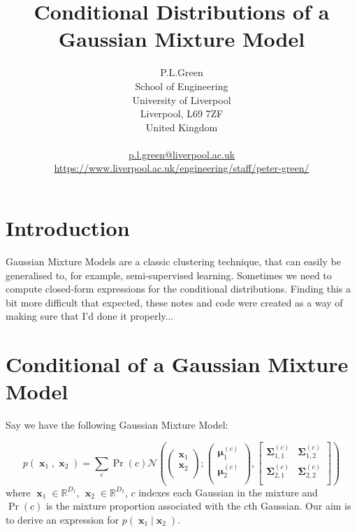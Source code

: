 \documentclass[a4paper, 11pt]{article}
\DeclareMathOperator{\x}{\boldsymbol{x}}
\DeclareMathOperator{\bmu}{\boldsymbol{\mu}}
\DeclareMathOperator{\bSigma}{\boldsymbol{\Sigma}}
\begin{document}
\title{Conditional Distributions of a Gaussian Mixture Model}
\author{P.L.Green\\
School of Engineering\\
University of Liverpool\\
Liverpool, L69 7ZF\\
United Kingdom\\
\\
\href{mailto:p.l.green@liverpool.ac.uk}{p.l.green@liverpool.ac.uk} \\
\url{https://www.liverpool.ac.uk/engineering/staff/peter-green/}
}
\maketitle

\section{Introduction}
Gaussian Mixture Models are a classic clustering technique, that can easily be generalised to, for example, semi-supervised learning. Sometimes we need to compute closed-form expressions for the conditional distributions. Finding this a bit more difficult that expected, these notes and code were created as a way of making sure that I'd done it properly...  

\section{Conditional of a Gaussian Mixture Model}
Say we have the following Gaussian Mixture Model:

\begin{equation}
	p(\x_1, \x_2) = 
    \sum_c \Pr(c)
    \mathcal{N}\left(
		\left(
		\begin{array}{c}
			\x_1 \\
			\x_2 \\
		\end{array}
		\right);
		\left(
		\begin{array}{c}
			\bmu_1^{(c)} \\
			\bmu_2^{(c)} \\
		\end{array}
		\right),
		\left[
		\begin{array}{cc}
			\bSigma_{1,1}^{(c)} & \bSigma_{1,2}^{(c)} \\
			\bSigma_{2,1}^{(c)} & \bSigma_{2,2}^{(c)} \\
		\end{array}
		\right]
	\right)
\end{equation}
where $\x_1 \in \mathbb{R}^{D_1}$, $\x_2 \in \mathbb{R}^{D_2}$, $c$ indexes each Gaussian in the mixture and $\Pr(c)$ is the mixture proportion associated with the $c$th Gaussian. Our aim is to derive an expression for $p(\x_1 | \x_2)$. \\
\end{document}
